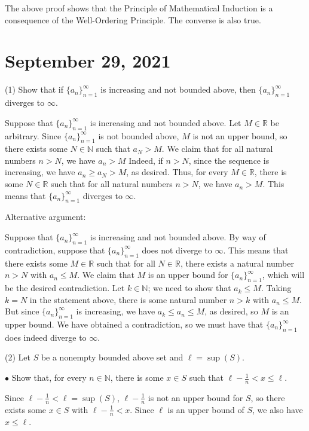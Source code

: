 \documentclass[12pt]{amsart}
\newcommand{\R}{{\mathbb{R}}}
\newcommand{\N}{\mathbb{N}}
\numberwithin{equation}{section}
\theoremstyle{plain} %
\newcommand{\Sept}[1]{\section{September #1, 2021}}
\theoremstyle{definition}
\theoremstyle{remark}
\begin{document}
The above proof shows that the Principle of Mathematical Induction is a consequence of the Well-Ordering Principle. The converse is also true.

\Sept{29}

(1) Show that if $\{a_n\}_{n=1}^\infty$ is increasing and not bounded above, then $\{a_n\}_{n=1}^\infty$ diverges to $\infty$.
\begin{framed}
Suppose that $\{a_n\}_{n=1}^\infty$ is increasing and not bounded above.
Let $M\in \R$ be arbitrary. Since $\{a_n\}_{n=1}^\infty$ is not bounded above, $M$ is not an upper bound, so there exists some $N\in \N$ such that $a_N > M$. We claim that for all natural numbers $n>N$, we have $a_n>M$ Indeed, if $n>N$, since the sequence is increasing, we have $a_n \geq a_N >M$, as desired. Thus, for every $M\in \R$, there is some $N\in \R$ such that for all natural numbers $n>N$, we have $a_n>M$. This means that $\{a_n\}_{n=1}^\infty$ diverges to $\infty$.

\hrulefill


Alternative argument:


\hrulefill


Suppose that $\{a_n\}_{n=1}^\infty$ is increasing and not bounded above. By way of contradiction, suppose that $\{a_n\}_{n=1}^\infty$ does not diverge to $\infty$. This means that there exists some $M\in \R$ such that for all $N\in \R$, there exists a natural number $n>N$ with $a_n \leq M$. We claim that $M$ is an upper bound for $\{a_n\}_{n=1}^\infty$, which will be the desired contradiction. Let $k\in \N$; we need to show that $a_k \leq M$. Taking $k=N$ in the statement above, there is some natural number $n>k$ with $a_n \leq M$. But since $\{a_n\}_{n=1}^\infty$ is increasing, we have $a_k \leq a_n \leq M$, as desired, so $M$ is an upper bound. We have obtained a contradiction, so we must have that $\{a_n\}_{n=1}^\infty$ does indeed diverge to $\infty$.
\end{framed}


(2) Let $S$ be a nonempty bounded above set and $\ell=\sup(S)$.

$\bullet$ Show that, for every $n\in \N$, there is some $x\in S$ such that $\ell-\frac{1}{n} < x \leq \ell$.

\begin{framed}
Since $\ell-\frac1n < \ell = \sup(S)$, $\ell-\frac1n$ is not an upper bound for $S$, so there exists some $x\in S$ with $\ell-\frac1n < x$. Since $\ell$ is an upper bound of $S$, we also have $x\leq \ell$.
\end{framed}
\end{document}
